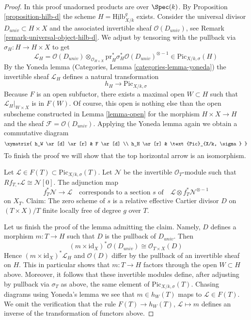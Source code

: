 \begin{proof}
In this proof unadorned products are over $\Spec(k)$.
By Proposition \ref{proposition-hilb-d} the scheme
$H = \underline{\text{Hilb}}^g_{X/k}$ exists.
Consider the universal divisor $D_{univ} \subset H \times X$
and the associated invertible sheaf $\mathcal{O}(D_{univ})$, see
Remark \ref{remark-universal-object-hilb-d}.
We adjust by tensoring with the pullback via
$\sigma_H : H \to H \times X$ to get
$$
\mathcal{L}_H =
\mathcal{O}(D_{univ})
\otimes_{\mathcal{O}_{H \times X}}
\text{pr}_H^*\sigma_H^*\mathcal{O}(D_{univ})^{\otimes -1}
\in
\text{Pic}_{X/k, \sigma}(H)
$$
By the Yoneda lemma (Categories, Lemma \ref{categories-lemma-yoneda})
the invertible sheaf $\mathcal{L}_H$ defines a natural transformation
$$
h_H \longrightarrow \text{Pic}_{X/k, \sigma}
$$
Because $F$ is an open subfuctor, there exists a maximal open
$W \subset H$ such that $\mathcal{L}_H|_{W \times X}$ is in
$F(W)$. Of course, this open is nothing else than the
open subscheme constructed in
Lemma \ref{lemma-open} for the morphism $H \times X \to H$ and the sheaf
$\mathcal{F} = \mathcal{O}(D_{univ})$. Applying the Yoneda lemma
again we obtain a commutative diagram
$$
\xymatrix{
h_W \ar[d] \ar[r] & F \ar[d] \\
h_H \ar[r] & \text{Pic}_{X/k, \sigma}
}
$$
To finish the proof we will show that the top horizontal arrow is an
isomorphism.

\medskip\noindent
Let $\mathcal{L} \in F(T) \subset \text{Pic}_{X/k, \sigma}(T)$.
Let $\mathcal{N}$ be the invertible $\mathcal{O}_T$-module
such that $Rf_{T, *}\mathcal{L} \cong \mathcal{N}[0]$.
The adjunction map
$$
f_T^*\mathcal{N} \longrightarrow \mathcal{L}
\quad\text{corresponds to a section }s\text{ of}\quad
\mathcal{L} \otimes f_T^*\mathcal{N}^{\otimes -1}
$$
on $X_T$. Claim: The zero scheme of $s$ is a relative effective Cartier
divisor $D$ on $(T \times X)/T$ finite locally free of degree $g$ over $T$.

\medskip\noindent
Let us finish the proof of the lemma admitting the claim.
Namely, $D$ defines a morphism $m : T \to H$ such that $D$ is the pullback of
$D_{univ}$. Then
$$
(m \times \text{id}_X)^*\mathcal{O}(D_{univ}) \cong
\mathcal{O}_{T \times X}(D)
$$
Hence $(m \times \text{id}_X)^*\mathcal{L}_H$ and $\mathcal{O}(D)$
differ by the pullback of an invertible sheaf on $H$. This in particular
shows that $m : T \to H$ factors through the open $W \subset H$ above.
Moreover, it follows that these invertible modules define, after adjusting
by pullback via $\sigma_T$ as above, the same element of
$\text{Pic}_{X/k, \sigma}(T)$. Chasing diagrams using Yoneda's lemma
we see that $m \in h_W(T)$ maps to $\mathcal{L} \in F(T)$. We omit
the verification that the rule $F(T) \to h_W(T)$,
$\mathcal{L} \mapsto m$ defines an inverse of the transformation
of functors above.


\end{proof}
